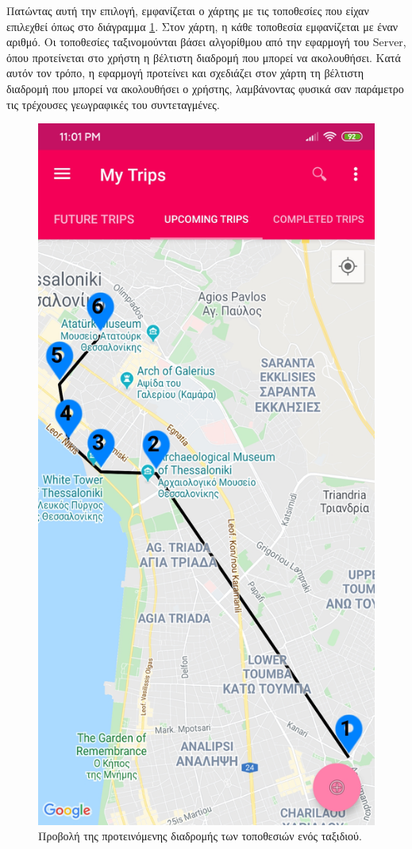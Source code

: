 \documentclass[oneside, 12pt]{book}
\begin{document}
Πατώντας αυτή την επιλογή, εμφανίζεται ο χάρτης με τις τοποθεσίες που 
είχαν επιλεχθεί όπως στο διάγραμμα 
\ref{fig:upcoming_trips_directions}.
Στον χάρτη, η κάθε τοποθεσία εμφανίζεται με έναν αριθμό. Οι 
τοποθεσίες ταξινομούνται βάσει αλγορίθμου από την εφαρμογή του 
Server, όπου προτείνεται στο χρήστη η βέλτιστη διαδρομή που μπορεί να 
ακολουθήσει.
Κατά αυτόν τον τρόπο, η εφαρμογή προτείνει και σχεδιάζει στον χάρτη 
τη βέλτιστη διαδρομή που μπορεί να ακολουθήσει ο χρήστης, λαμβάνοντας φυσικά σαν παράμετρο τις τρέχουσες γεωγραφικές του συντεταγμένες.
\begin{figure}[H]
  \centering
  \includegraphics[scale=0.15]{images/upcoming_trips_directions.jpg}
  \caption{\label{fig:upcoming_trips_directions}Προβολή της προτεινόμενης διαδρομής των τοποθεσιών ενός ταξιδιού.}
\end{figure}
\end{document}
